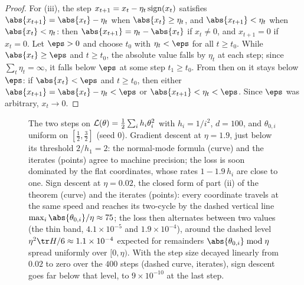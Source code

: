 \begin{refsection}
\begin{proof}
For (iii), the step $x_{t+1}=x_t-\eta_t\operatorname{sign}(x_t)$ satisfies $\abs{x_{t+1}}=\abs{x_t}-\eta_t$ when $\abs{x_t}\ge\eta_t$, and $\abs{x_{t+1}}<\eta_t$ when $\abs{x_t}<\eta_t$: then $\abs{x_{t+1}}=\eta_t-\abs{x_t}$ if $x_t\ne0$, and $x_{t+1}=0$ if $x_t=0$. Let $\eps>0$ and choose $t_0$ with $\eta_t<\eps$ for all $t\ge t_0$. While $\abs{x_t}\ge\eps$ and $t\ge t_0$, the absolute value falls by $\eta_t$ at each step; since $\sum_t\eta_t=\infty$, it falls below $\eps$ at some step $t_1\ge t_0$. From then on it stays below $\eps$: if $\abs{x_t}<\eps$ and $t\ge t_0$, then either $\abs{x_{t+1}}=\abs{x_t}-\eta_t<\eps$ or $\abs{x_{t+1}}<\eta_t<\eps$. Since $\eps$ was arbitrary, $x_t\to0$.
\end{proof}

\begin{figure}[t]
\centering
{}
\caption{The two steps on $\mathcal{L}(\theta)=\frac12\sum_ih_i\theta_i^2$ with $h_i=1/i^2$, $d=100$, and $\theta_{0,i}$ uniform on $[\frac12,\frac32]$ (seed $0$). Gradient descent at $\eta=1.9$, just below its threshold $2/h_1=2$: the normal-mode formula (curve) and the iterates (points) agree to machine precision; the loss is soon dominated by the flat coordinates, whose rates $1-1.9\,h_i$ are close to one. Sign descent at $\eta=0.02$, the closed form of part (ii) of the theorem (curve) and the iterates (points): every coordinate travels at the same speed and reaches its two-cycle by the dashed vertical line $\max_i\abs{\theta_{0,i}}/\eta\approx75$; the loss then alternates between two values (the thin band, $4.1\times10^{-5}$ and $1.9\times10^{-4}$), around the dashed level $\eta^2\tr H/6\approx1.1\times10^{-4}$ expected for remainders $\abs{\theta_{0,i}}\bmod\eta$ spread uniformly over $[0,\eta)$. With the step size decayed linearly from $0.02$ to zero over the $400$ steps (dashed curve, iterates), sign descent goes far below that level, to $9\times10^{-10}$ at the last step.}
\label{fig:prologue:quadratic}
\end{figure}


\end{refsection}
